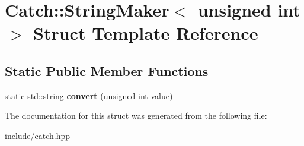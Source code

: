 \hypertarget{structCatch_1_1StringMaker_3_01unsigned_01int_01_4}{}\section{Catch\+:\+:String\+Maker$<$ unsigned int $>$ Struct Template Reference}
\label{structCatch_1_1StringMaker_3_01unsigned_01int_01_4}
\subsection*{Static Public Member Functions}
\begin{DoxyCompactItemize}
\item 
static std\+::string {\bfseries convert} (unsigned int value)\hypertarget{structCatch_1_1StringMaker_3_01unsigned_01int_01_4_aa0ec816ef8a65664b0524d55d08e2fd9}{}\label{structCatch_1_1StringMaker_3_01unsigned_01int_01_4_aa0ec816ef8a65664b0524d55d08e2fd9}

\end{DoxyCompactItemize}


The documentation for this struct was generated from the following file\+:\begin{DoxyCompactItemize}
\item 
include/catch.\+hpp\end{DoxyCompactItemize}

